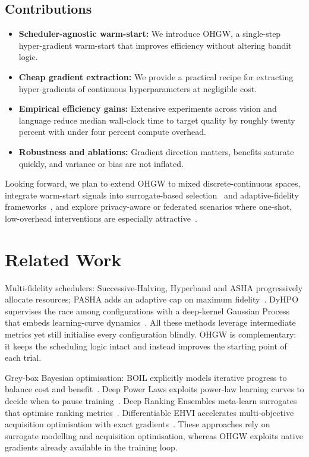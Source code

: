 \documentclass{article}
\begin{document}
\subsection{Contributions}
\begin{itemize}
  \item \textbf{Scheduler-agnostic warm-start:} We introduce OHGW, a single-step hyper-gradient warm-start that improves efficiency without altering bandit logic.
  \item \textbf{Cheap gradient extraction:} We provide a practical recipe for extracting hyper-gradients of continuous hyperparameters at negligible cost.
  \item \textbf{Empirical efficiency gains:} Extensive experiments across vision and language reduce median wall-clock time to target quality by roughly twenty percent with under four percent compute overhead.
  \item \textbf{Robustness and ablations:} Gradient direction matters, benefits saturate quickly, and variance or bias are not inflated.
\end{itemize}

Looking forward, we plan to extend OHGW to mixed discrete-continuous spaces, integrate warm-start signals into surrogate-based selection~\cite{khazi-2023-deep} and adaptive-fidelity frameworks~\cite{jiang-2024-efficient}, and explore privacy-aware or federated scenarios where one-shot, low-overhead interventions are especially attractive~\cite{panda-2022-new,khodak-2021-federated}.

\section{Related Work}
Multi-fidelity schedulers: Successive-Halving, Hyperband and ASHA progressively allocate resources; PASHA adds an adaptive cap on maximum fidelity~\cite{bohdal-2022-pasha}. DyHPO supervises the race among configurations with a deep-kernel Gaussian Process that embeds learning-curve dynamics~\cite{wistuba-2022-supervising}. All these methods leverage intermediate metrics yet still initialise every configuration blindly. OHGW is complementary: it keeps the scheduling logic intact and instead improves the starting point of each trial.

Grey-box Bayesian optimisation: BOIL explicitly models iterative progress to balance cost and benefit~\cite{nguyen-2019-bayesian}. Deep Power Laws exploits power-law learning curves to decide when to pause training~\cite{kadra-2023-scaling}. Deep Ranking Ensembles meta-learn surrogates that optimise ranking metrics~\cite{khazi-2023-deep}. Differentiable EHVI accelerates multi-objective acquisition optimisation with exact gradients~\cite{daulton-2020-differentiable}. These approaches rely on surrogate modelling and acquisition optimisation, whereas OHGW exploits native gradients already available in the training loop.
\end{document}
